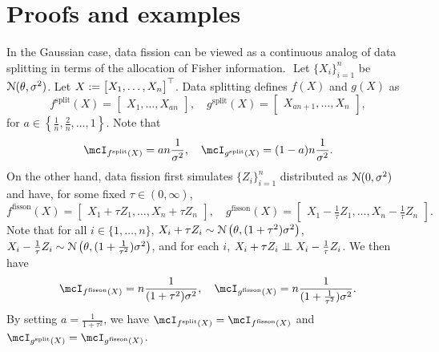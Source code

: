 \section{Proofs and examples}
\bexa\label{eg:fisher}
In the Gaussian case, data fission can be viewed as a continuous analog of data splitting in terms of the allocation of Fisher information.
\newline $ $
Let $\{X_i\}_{i=1}^n$ be \iid $\mathcal{N}(\theta, \sigma^2)$. Let $X := \begin{bmatrix} X_1, \dots, X_n \end{bmatrix}^\top$. Data splitting defines $f(X)$ and $g(X)$ as
\[
f^{\text{split}}(X) = \begin{bmatrix} X_1, \dots, X_{an} \end{bmatrix},\quad
g^{\text{split}}(X) = \begin{bmatrix} X_{an+1}, \dots, X_{n} \end{bmatrix},
\]
for $a\in\left\{\frac{1}{n}, \frac{2}{n}, \dots, 1\right\}$.
Note that
\[
\mcI_{f^{\text{split}}(X)} = an\frac{1}{\sigma^2},\quad
\mcI_{g^{\text{split}}(X)} = (1-a)n\frac{1}{\sigma^2}.
\]
On the other hand, data fission first simulates $\{Z_i\}_{i=1}^n$ distributed as \iid $\mathcal{N}(0, \sigma^2)$ and have, for some fixed $\tau\in(0,\infty)$,
\[
f^{\text{fisson}}(X) = \begin{bmatrix} X_1 + \tau Z_1, \dots, X_n + \tau Z_n \end{bmatrix},\quad
g^{\text{fisson}}(X) = \begin{bmatrix} X_1 - \frac{1}{\tau}Z_1, \dots, X_n - \frac{1}{\tau}Z_n \end{bmatrix}.
\]
Note that for all $i\in\{1,\dots,n\}$, $X_i + \tau Z_i \sim \mathcal{N}\left(\theta, (1+\tau^2)\sigma^2 \right)$, $X_i - \frac{1}{\tau} Z_i \sim \mathcal{N}\left(\theta, (1+\frac{1}{\tau^2})\sigma^2 \right)$, and for each $i$, $X_i + \tau Z_i \indep X_i - \frac{1}{\tau} Z_i$. We then have
\[
\mcI_{f^{\text{fisson}}(X)} = n\frac{1}{(1+\tau^2)\sigma^2},\quad
\mcI_{g^{\text{fisson}}(X)} = n\frac{1}{(1+\frac{1}{\tau^2})\sigma^2}.
\]
By setting $a = \frac{1}{1+\tau^2}$, we have $\mcI_{f^{\text{split}}(X)} = \mcI_{f^{\text{fisson}}(X)}$ and $\mcI_{g^{\text{split}}(X)} = \mcI_{g^{\text{fisson}}(X)}$.
\eexa

